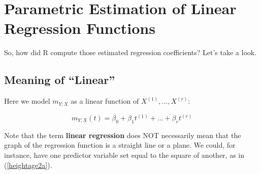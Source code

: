 % 
% 
% 
% 

\section{Parametric Estimation of Linear Regression Functions}
\label{parest}

So, how did R compute those estimated regression coefficients?  Let's
take a look.

\subsection{Meaning of ``Linear''}
\label{whatmeans}

Here we model $m_{Y;X}$ as a linear function of $X^{(1)},...,X^{(r)}$:

\begin{equation}
\label{linmod}
m_{Y;X}(t) = \beta_0 + \beta_1 t^{(1)} + ... + \beta_r t^{(r)}
\end{equation}

Note that the term {\bf linear regression} does NOT necessarily mean
that the graph of the regression function is a straight line or a plane.
We could, for instance, have one predictor variable set equal to the
square of another, as in (\ref{heightage2a}).

